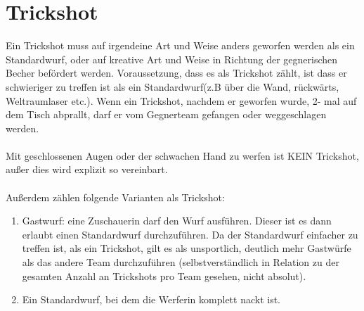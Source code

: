 \documentclass[a5paper, 12pt]{book}
\begin{document}
\section{Trickshot}\label{sec:trickshot}
Ein Trickshot muss auf irgendeine Art und Weise anders geworfen werden als ein Standardwurf, oder auf kreative Art und Weise in Richtung der gegnerischen Becher befördert werden. Voraussetzung, dass es als Trickshot zählt, ist dass er schwieriger zu treffen ist als ein Standardwurf(z.B über die Wand, rückwärts, Weltraumlaser etc.). Wenn ein Trickshot, nachdem er geworfen wurde, 2- mal auf dem Tisch abprallt, darf er vom Gegnerteam gefangen oder weggeschlagen werden.\\\\
Mit geschlossenen Augen oder der schwachen Hand zu werfen ist KEIN Trickshot, außer dies wird explizit so vereinbart.\\\\
Außerdem zählen folgende Varianten als Trickshot:
\begin{enumerate}[(1)]
    \item Gastwurf: eine Zuschauerin darf den Wurf ausführen. Dieser ist es dann erlaubt einen Standardwurf durchzuführen. Da der Standardwurf einfacher zu treffen ist, als ein Trickshot, gilt es als unsportlich, deutlich mehr Gastwürfe als das andere Team durchzuführen (selbstverständlich in Relation zu der gesamten Anzahl an Trickshots pro Team gesehen, nicht absolut).
    \item Ein Standardwurf, bei dem die Werferin komplett nackt ist.
\end{enumerate}
\end{document}
